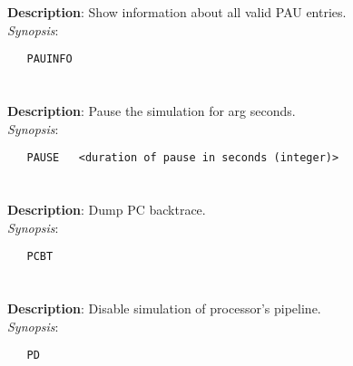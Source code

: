 \section{\quad{}}
\label{manpages:PAUINFO}
\label{manpages:pauinfo}
\vspace{-0.1in}
{\bf Description}: 	Show information about all valid PAU entries.\\[1.5ex]
{\em Synopsis}:
\vspace{-0.05in}
\scriptsize
\begin{lstlisting}
   PAUINFO   								
\end{lstlisting}
\normalsize
\vspace{-0.05in}


\section{\quad{}}
\label{manpages:PAUSE}
\label{manpages:pause}
\vspace{-0.1in}
{\bf Description}: 	Pause the simulation for arg seconds.\\[1.5ex]
{\em Synopsis}:
\vspace{-0.05in}
\scriptsize
\begin{lstlisting}
   PAUSE   <duration of pause in seconds (integer)>					
\end{lstlisting}
\normalsize
\vspace{-0.05in}


\section{\quad{}}
\label{manpages:PCBT}
\label{manpages:pcbt}
\vspace{-0.1in}
{\bf Description}: 	Dump PC backtrace.\\[1.5ex]
{\em Synopsis}:
\vspace{-0.05in}
\scriptsize
\begin{lstlisting}
   PCBT   																							
\end{lstlisting}
\normalsize
\vspace{-0.05in}


\section{\quad{}}
\label{manpages:PD}
\label{manpages:pd}
\vspace{-0.1in}
{\bf Description}: 	Disable simulation of processor's pipeline.\\[1.5ex]
{\em Synopsis}:
\vspace{-0.05in}
\scriptsize
\begin{lstlisting}
   PD   								
\end{lstlisting}
\normalsize
\vspace{-0.05in}


